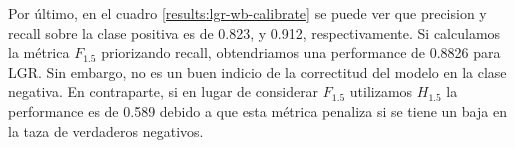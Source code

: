 Por último, en el cuadro \ref{results:lgr-wb-calibrate} se puede ver que
precision y recall sobre la clase positiva es de 0.823, y 0.912,
respectivamente. Si calculamos la métrica $F_{1.5}$ priorizando recall,
obtendriamos una performance de 0.8826 para LGR. Sin embargo, no es un buen
indicio de la correctitud del modelo en la clase negativa. En contraparte, si en
lugar de considerar $F_{1.5}$ utilizamos $H_{1.5}$ la performance es de 0.589
debido a que esta métrica penaliza si se tiene un baja en la taza de verdaderos
negativos.


\begin{table}[t!]
\centering
{}
 \caption{Métricas sobre el conjunto de test del modelo de LGR con word embeddings.}
 \label{results:lgr-wb-calibrate}
\end{table}


